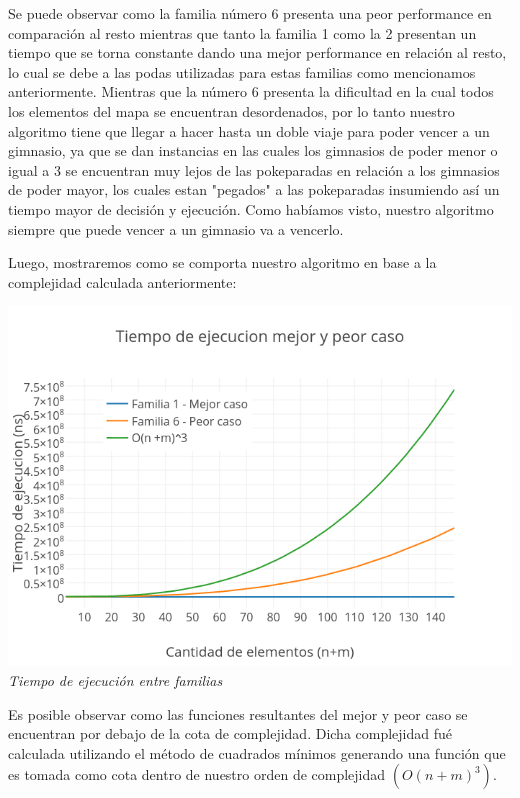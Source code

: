 Se puede observar como la familia n\'umero 6 presenta una peor performance en comparaci\'on al resto mientras que tanto la familia 1 como la 2 presentan un tiempo que se torna constante dando una mejor performance en relaci\'on al resto, lo cual se debe a las podas utilizadas para estas familias como mencionamos anteriormente. Mientras que la n\'umero 6 presenta la dificultad en la cual todos los elementos del mapa se encuentran desordenados, por lo tanto nuestro algoritmo tiene que llegar a hacer hasta un doble viaje para poder vencer a un gimnasio, ya que se dan instancias en las cuales los gimnasios de poder menor o igual a 3 se encuentran muy lejos de las pokeparadas en relaci\'on a los gimnasios de poder mayor, los cuales estan "pegados" a las pokeparadas insumiendo as\'i un tiempo mayor de decisi\'on y ejecuci\'on. Como hab\'iamos visto, nuestro algoritmo siempre que puede vencer a un gimnasio va a vencerlo.

Luego, mostraremos como se comporta nuestro algoritmo en base a la complejidad calculada anteriormente:

\vspace*{0.3cm} \vspace*{0.3cm}
  \begin{center}
\includegraphics[scale=0.60]{./EJ2/mejorcaso.png}
\\{\textit{Tiempo de ejecución entre familias}}
  \end{center}
  \vspace*{0.3cm}

  
Es posible observar como las funciones resultantes del mejor y peor caso se encuentran por debajo de la cota de complejidad. Dicha complejidad fué calculada utilizando el m\'etodo de cuadrados m\'inimos generando una función que es tomada como cota dentro de nuestro orden de complejidad $(O(n+m)^3)$. 

